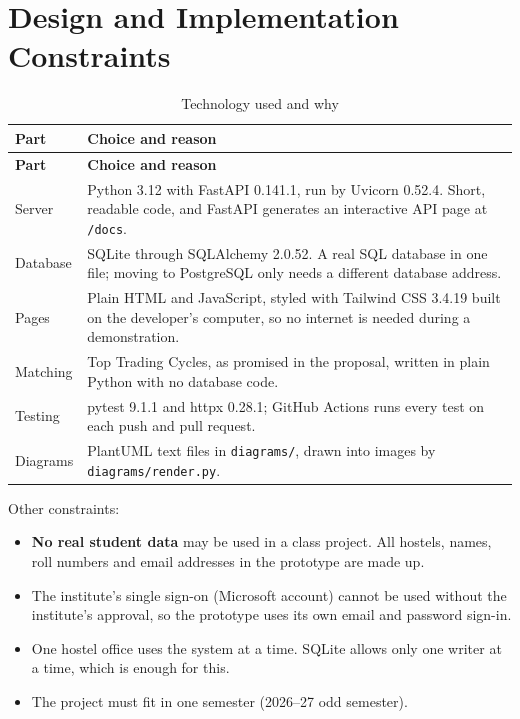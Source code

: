 \documentclass[11pt,a4paper,parskip=half,toc=listof]{scrreprt}
\begin{document}
\section{Design and Implementation Constraints}

\begin{xltabular}{\linewidth}{@{}L{3.4cm}Y@{}}
  \caption{Technology used and why}\label{tab:stack}\\
  \toprule
  \textbf{Part} & \textbf{Choice and reason}\\
  \midrule
  \endfirsthead
  \toprule
  \textbf{Part} & \textbf{Choice and reason}\\
  \midrule
  \endhead
  Server & Python 3.12 with FastAPI 0.141.1, run by Uvicorn 0.52.4. Short,
    readable code, and FastAPI generates an interactive API page at
    \texttt{/docs}.\\
  Database & SQLite through SQLAlchemy 2.0.52. A real SQL database in one
    file; moving to PostgreSQL only needs a different database
    address.\\
  Pages & Plain HTML and JavaScript, styled with Tailwind CSS 3.4.19 built
    on the developer's computer, so no internet is needed during a
    demonstration.\\
  Matching & Top Trading Cycles, as promised in the proposal, written in
    plain Python with no database code.\\
  Testing & pytest 9.1.1 and httpx 0.28.1; GitHub Actions runs every test
    on each push and pull request.\\
  Diagrams & PlantUML text files in \texttt{diagrams/}, drawn into images
    by \texttt{diagrams/render.py}.\\
  \bottomrule
\end{xltabular}

Other constraints:
\begin{itemize}
  \item \textbf{No real student data} may be used in a class project. All
    hostels, names, roll numbers and email addresses in the prototype are
    made up.
  \item The institute's single sign-on (Microsoft account) cannot be used
    without the institute's approval, so the prototype uses its own email
    and password sign-in.
  \item One hostel office uses the system at a time. SQLite allows only
    one writer at a time, which is enough for this.
  \item The project must fit in one semester (2026--27 odd semester).
\end{itemize}
\end{document}
